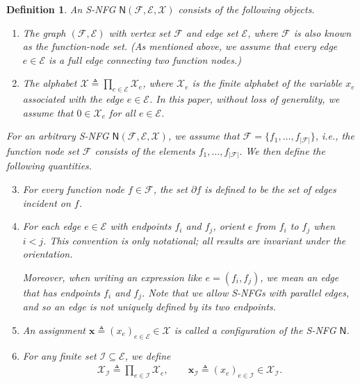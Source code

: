 \documentclass[journal]{IEEEtran}
\newcommand{\add}[1]{{\color{black}#1}}
\newtheorem{definition}[theorem]{Definition}
\newcommand{\vect}[1]{ \bm{#1} }
\newcommand{\set}[1]{\mathcal{#1}}
\newcommand{\setEfull}{ \mathcal{E} }
\newcommand{\setF}{ \mathcal{F} }
\newcommand{\sfN}{ \mathsf{N} }
\newcommand{\setpf}{ \partial f }
\newcommand{\xe}{ x_{e} }
\newcommand{\setxe}{ \mathcal{X}_{e} }
\newcommand{\setx}{ \mathcal{X} }
\newcommand{\vx}{ \vect{x} }
\newcommand{\graphN}{ \mathsf{N} }
\newcommand{\defeq}{ \triangleq }
\newcommand*{\ie}{\textit{i.e.}}
\begin{document}
\begin{definition}
  \label{def: def of snfg}
  An S-NFG $\graphN(\setF, \setEfull, \set{X})$ consists of the following
  objects.
  \begin{enumerate}

    \item The graph $(\setF,\setEfull)$ with vertex set $\setF$ and edge set
          $\setEfull$, where $\setF$ is also known as \add{the function-node
            set}. (As mentioned above, \add{we assume that every edge
            $e \in \setEfull$ is a full} edge connecting two function nodes.)

    \item The alphabet $\set{X} \defeq \prod_{e \in \setEfull} \setxe$, where
          $\setxe$ is the finite alphabet of the variable $\xe$ associated with the
          edge $e \in \setEfull$. In this paper, without loss of generality, we
          assume that $ 0 \in \setxe$ for all $ e \in \setEfull $.

  \end{enumerate}
  For an arbitrary S-NFG $\graphN(\setF,\setEfull,\set{X})$, we assume that
  $ \set{F} = \{ f_{1},\ldots,f_{|\set{F}|} \} $, \ie, the function node set
  $ \set{F} $ consists of the elements $ f_{1},\ldots,f_{|\set{F}|}. $ \add{We
    then define the following quantities.}

  \begin{enumerate}
    \setcounter{enumi}{2}

    \item For every function node $f \in \setF$, the set $\setpf$ is defined to
          be the set of edges incident on $f$.

    \item \add{For each edge $e\in\setEfull$ with endpoints $f_i$ and $f_j$,
            orient $e$ from $f_i$ to $f_j$ when $i < j$. This convention is only
            notational; all results are invariant under the orientation.

            Moreover, when writing an expression like $e = (f_i, f_j)$, we mean an
            edge that has endpoints $f_i$ and $f_j$. Note that we allow S-NFGs with
            parallel edges, and so an edge is not uniquely defined by its two
            endpoints.}

    \item An assignment $\vx \defeq (\xe)_{e \in \setEfull} \in \set{X}$ is
          called a configuration of the S-NFG $ \sfN $.

    \item For any finite set $ \set{I} \subseteq \setEfull $, we define
          \begin{align*}
            \setx_{ \set{I} } \defeq
            \prod_{ e \in \set{I} } \setxe, \qquad
            \vx_{\set{I}} \defeq (\xe)_{e \in \set{I}}
            \in \setx_{ \set{I} }.
          \end{align*}


\end{enumerate}
\end{definition}
\end{document}
